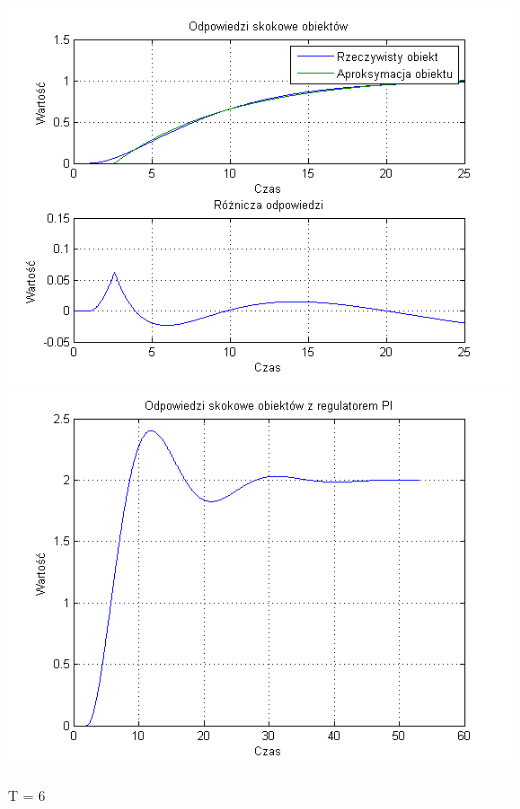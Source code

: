 \documentclass[10pt,a4paper]{article}
\begin{document}
\begin{center}
\includegraphics[scale=1]{images/jeden/skrypt_67.png}\\
\includegraphics[scale=1]{images/jeden/skrypt_68.png}\\
\end{center}
\newpage
T = 6
\end{document}
